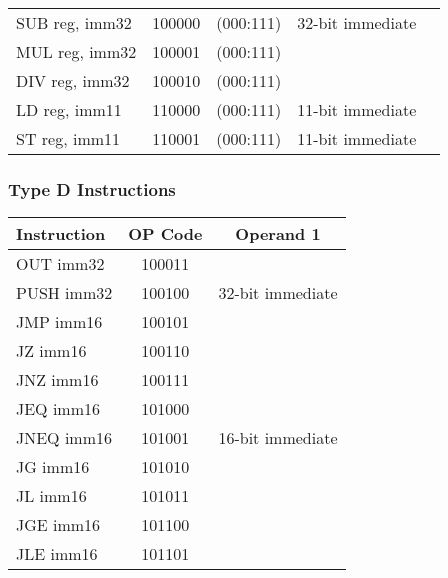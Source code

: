 \documentclass[a4paper, 11pt]{report}
\begin{document}
\begin{center}
\begin{tabular}{|l|c|c|c|c|}
        \cline{1-3}
        \cline{5-5}
        SUB reg, imm32       & 100000           & (000:111)          & 32-bit immediate   &                          \\
        \cline{1-3}
        \cline{5-5}
        MUL reg, imm32       & 100001           & (000:111)          &                    &                          \\
        \cline{1-3}
        \cline{5-5}
        DIV reg, imm32       & 100010           & (000:111)          &                    &                          \\
        \hline
        LD reg, imm11        & 110000           & (000:111)          & 11-bit immediate   &                          \\
        \hline
        ST reg, imm11        & 110001           & (000:111)          & 11-bit immediate   &                          \\
        \hline
    \end{tabular}
\end{center}

\subsubsection{Type D Instructions}
\begin{center}
    \begin{tabular}{|l|c|c|}
        \hline
        \textbf{Instruction} & \textbf{OP Code} & \textbf{Operand 1} \\
        \hline
        OUT imm32            & 100011           &                    \\
        \cline{1-2}
        PUSH imm32           & 100100           & 32-bit immediate   \\
        \hline
        JMP imm16            & 100101           &                    \\
        \cline{1-2}
        JZ imm16             & 100110           &                    \\
        \cline{1-2}
        JNZ imm16            & 100111           &                    \\
        \cline{1-2}
        JEQ imm16            & 101000           &                    \\
        \cline{1-2}
        JNEQ imm16           & 101001           & 16-bit immediate   \\
        \cline{1-2}
        JG imm16             & 101010           &                    \\
        \cline{1-2}
        JL imm16             & 101011           &                    \\
        \cline{1-2}
        JGE imm16            & 101100           &                    \\
        \cline{1-2}
        JLE imm16            & 101101           &                    \\
        \cline{1-2}
        \hline
    \end{tabular}
\end{center}
\end{document}

